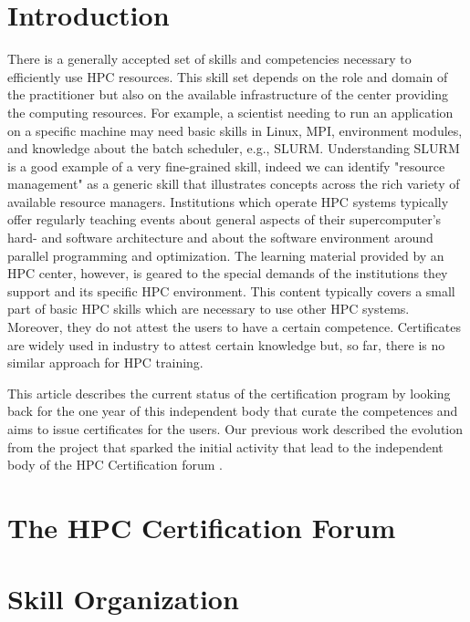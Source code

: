\documentclass[jocse]{jocseart}
\begin{document}
\keywords{}

\maketitle

\section{Introduction}

There is a generally accepted set of skills and competencies necessary to efficiently use HPC resources.
This skill set depends on the role and domain of the practitioner but also on the available infrastructure of the center providing the computing resources.
For example, a scientist needing to run an application on a specific machine may need basic skills in Linux, MPI, environment modules, and knowledge about the batch scheduler, e.g., SLURM.
Understanding SLURM is a good example of a very fine-grained skill, indeed we can identify "resource management" as a generic skill that illustrates concepts across the rich variety of available resource managers.
Institutions which operate HPC systems typically offer regularly teaching events about general aspects of their supercomputer's hard- and software architecture and about the software environment around parallel programming and optimization.
The learning material provided by an HPC center, however, is geared to the special demands of the institutions they support and its specific HPC environment.
This content typically covers a small part of basic HPC skills which are necessary to use other HPC systems.
Moreover, they do not attest the users to have a certain competence.
Certificates are widely used in industry to attest certain knowledge but, so far, there is no similar approach for HPC training.

This article describes the current status of the certification program by looking back for the one year of this independent body that curate the competences and aims to issue certificates for the users.
Our previous work described the evolution from the project that sparked the initial activity that lead to the independent body of the HPC Certification forum \cite{TAHCPKHHSS19}.


\section{The HPC Certification Forum}

\section{Skill Organization}
\end{document}
